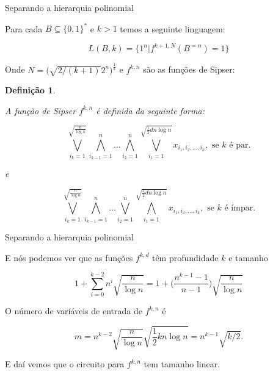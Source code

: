 \documentclass[landscape, 9pt]{beamer}
\newtheorem{defi}[teo]{Definição}
\newcommand{\binalph}{\{0, 1\}}
\begin{document}
\begin{frame} {Separando a hierarquia polinomial}

Para cada $B \subseteq \binalph^{*}$ e $k > 1$ temos a seguinte linguagem:

\begin{equation*}
	L(B, k) = \{1^{n} \lvert f^{k + 1, N}(B^{=n}) = 1\}
\end{equation*}

Onde $N = \big( \sqrt{2/(k + 1)}2^{n}\big)^{\frac{1}{k}}$ e $f^{k, n}$ são as funções de Sipser:

\begin{defi} \label{Sipser_f}

A função de Sipser $f^{k, n}$ é definida da seguinte forma:

\begin{equation} \label{Sipser_f_def_1}
	\bigvee_{i_{k}  = 1}^{\sqrt{\frac{n}{\log n}}}\bigwedge_{i_{k - 1} = 1}^{n} \dots \bigwedge_{i_{2} = 1}^{n} \bigvee_{i_{1} = 1}^{\sqrt{\frac{1}{2}dn\log n}} x_{i_{1}, i_{2}, \dots, i_{k}}, \text{ se } k \text{ é par.}
\end{equation}

e

\begin{equation} \label{Sipser_f_def_2}
	\bigvee_{i_{k}  = 1}^{\sqrt{\frac{n}{\log n}}}\bigwedge_{i_{k - 1} = 1}^{n} \dots \bigvee_{i_{2} = 1}^{n} \bigwedge_{i_{1} = 1}^{\sqrt{\frac{1}{2}dn\log n}} x_{i_{1}, i_{2}, \dots, i_{k}}, \text{ se } k \text{ é ímpar.}
\end{equation}

\end{defi}

\end{frame}


\begin{frame} {Separando a hierarquia polinomial}

E nós podemos ver que as funções $f^{k, d}$ têm profundidade $k$ e tamanho

\begin{equation*}
	1 + \sum_{i = 0}^{k - 2}n^{i}\sqrt{\frac{n}{\log n}} = 1 + \Big( \frac{n^{k - 1} - 1}{n - 1}\Big)\sqrt{\frac{n}{\log n}}
\end{equation*}

O número de variáveis de entrada de $f^{k, n}$ é

\begin{equation*}
	m = n^{k - 2}\sqrt{\frac{n}{\log n}}\sqrt{\frac{1}{2}kn\log n} = n^{k - 1}\sqrt{k/2}.
\end{equation*}

E daí vemos que o circuito para $f^{k, n}$ tem tamanho linear.

\end{frame}
\end{document}
